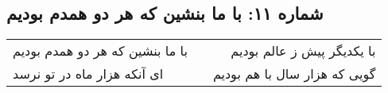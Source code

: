 \begin{center}
\section*{شماره ۱۱: با ما بنشین که هر دو همدم بودیم}
\label{sec:011}
\begin{longtable}{l p{0.5cm} r}
با ما بنشین که هر دو همدم بودیم
&&
با یکدیگر پیش ز عالم بودیم
\\
ای آنکه هزار ماه در تو نرسد
&&
گویی که هزار سال با هم بودیم
\\
\end{longtable}
\end{center}
